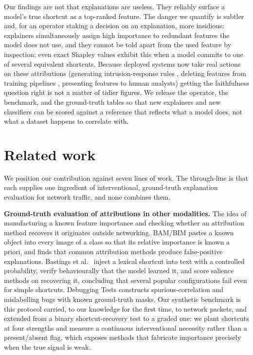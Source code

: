 \documentclass[journal]{IEEEtran}
\begin{document}
Our findings are not that explanations are useless. They reliably
surface a model's true shortcut as a top-ranked feature. The danger we
quantify is subtler and, for an operator staking a decision on an
explanation, more insidious: explainers simultaneously assign high
importance to redundant features the model does not use, and they cannot
be told apart from the used feature by inspection; even exact Shapley
values exhibit this when a model commits to one of several equivalent
shortcuts. Because deployed systems now take real actions on these
attributions (generating intrusion-response rules \cite{wei2023xnids},
deleting features from training pipelines
\cite{zhao2026shortcutcatcher}, presenting features to human analysts)
getting the faithfulness question right is not a matter of tidier
figures. We release the operator, the benchmark, and the ground-truth
tables so that new explainers and new classifiers can be scored against
a reference that reflects what a model does, not what a dataset happens
to correlate with.

\section{Related work}

We position our contribution against seven lines of work. The
through-line is that each supplies one ingredient of interventional,
ground-truth explanation evaluation for network traffic, and none
combines them.

\textbf{Ground-truth evaluation of attributions in other modalities.}
The idea of manufacturing a known feature importance and checking
whether an attribution method recovers it originates outside networking.
BAM/BIM \cite{yang2019bam} pastes a known object into every image of a
class so that its relative importance is known a priori, and finds that
common attribution methods produce false-positive explanations. Bastings
et al.~\cite{bastings2022shortcuts} inject a lexical shortcut into text
with a controlled probability, verify behaviourally that the model
learned it, and score salience methods on recovering it, concluding that
several popular configurations fail even for simple shortcuts. Debugging
Tests \cite{adebayo2020debugging} constructs spurious-correlation and
mislabelling bugs with known ground-truth masks. Our synthetic benchmark
is this protocol carried, to our knowledge for the first time, to
network packets, and extended from a binary shortcut-recovery test to a
graded one: we plant shortcuts at four strengths and measure a
continuous interventional necessity rather than a present/absent flag,
which exposes methods that fabricate importance precisely when the true
signal is weak.
\end{document}

